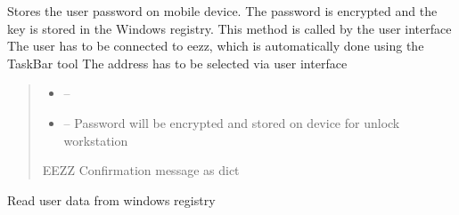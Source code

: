 \documentclass[letterpaper,10pt,english]{sphinxmanual}
\begin{document}
\begin{savenotes}
\begin{fulllineitems}
\begin{savenotes}
\begin{fulllineitems}
\end{fulllineitems}\end{savenotes}


\begin{savenotes}\begin{fulllineitems}
\label{\detokenize{eezz:eezz.session.TSession.pair_device}}
\pysigstartsignatures
{}
\pysigstopsignatures
\sphinxAtStartPar
Stores the user password on mobile device. The password is encrypted and the key is stored in the
Windows registry. This method is called by the user interface
\sphinxhyphen{} The user has to be connected to eezz, which is automatically done using the TaskBar tool
\sphinxhyphen{} The address has to be selected via user interface
\begin{quote}\begin{description}
\begin{itemize}
\item {} 
\sphinxAtStartPar
{} – 

\item {} 
\sphinxAtStartPar
{} – Password will be encrypted and stored on device for unlock workstation

\end{itemize}

\sphinxAtStartPar
EEZZ Confirmation message as dict

\end{description}\end{quote}

\end{fulllineitems}\end{savenotes}


\begin{savenotes}\begin{fulllineitems}
\label{\detokenize{eezz:eezz.session.TSession.read_windows_registry}}
\pysigstartsignatures
{}
\pysigstopsignatures
\sphinxAtStartPar
Read user data from windows registry


\end{fulllineitems}
\end{savenotes}
\end{fulllineitems}
\end{savenotes}
\end{document}
